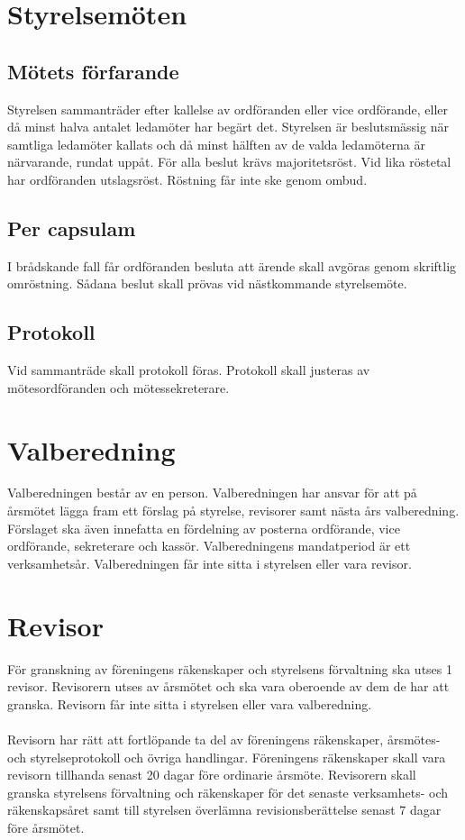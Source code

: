 \documentclass[a4paper,11pt]{article}
\begin{document}
\section{Styrelsemöten}
\subsection{Mötets förfarande}
Styrelsen sammanträder efter kallelse av ordföranden eller vice ordförande, eller då minst halva antalet ledamöter har begärt det. Styrelsen är beslutsmässig när samtliga ledamöter kallats och då minst hälften av de valda ledamöterna är närvarande, rundat uppåt. För alla beslut krävs majoritetsröst. Vid lika röstetal har ordföranden utslagsröst. Röstning får inte ske genom ombud.

\subsection{Per capsulam}
I brådskande fall får ordföranden besluta att ärende skall avgöras genom skriftlig omröstning. Sådana beslut skall prövas vid nästkommande styrelsemöte.

\subsection{Protokoll}
Vid sammanträde skall protokoll föras. Protokoll skall justeras av mötesordföranden och mötessekreterare.

\section{Valberedning}
Valberedningen består av en person. Valberedningen har ansvar för att på årsmötet lägga fram ett förslag på styrelse, revisorer samt nästa års valberedning. Förslaget ska även innefatta en fördelning av posterna ordförande, vice ordförande, sekreterare och kassör. Valberedningens mandatperiod är ett verksamhetsår. Valberedningen får inte sitta i styrelsen eller vara revisor.

\section{Revisor}
För granskning av föreningens räkenskaper och styrelsens förvaltning ska utses 1 revisor. Revisorern utses av årsmötet och ska vara oberoende av dem de har att granska. Revisorn får inte sitta i styrelsen eller vara valberedning.
\paragraph{}
Revisorn har rätt att fortlöpande ta del av föreningens räkenskaper, årsmötes- och styrelseprotokoll och
övriga handlingar. Föreningens räkenskaper skall vara revisorn tillhanda senast 20 dagar före ordinarie årsmöte. Revisorern skall granska styrelsens förvaltning och
räkenskaper för det senaste verksamhets- och räkenskapsåret samt till styrelsen överlämna
revisionsberättelse senast 7 dagar före årsmötet. 
\end{document}
